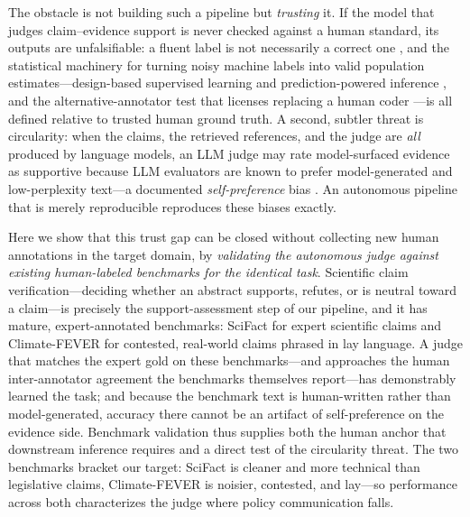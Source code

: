 The obstacle is not building such a pipeline but \emph{trusting} it. If the model that judges
claim--evidence support is never checked against a human standard, its outputs are unfalsifiable: a
fluent label is not necessarily a correct one \citep{bender2021stochastic}, and the statistical
machinery for turning noisy machine labels into valid population estimates---design-based supervised
learning and prediction-powered inference \citep{egami2023dsl,angelopoulos2023ppi}, and the
alternative-annotator test that licenses replacing a human coder \citep{calderon2025alttest}---is all
defined relative to trusted human ground truth. A second, subtler threat is circularity: when the
claims, the retrieved references, and the judge are \emph{all} produced by language models, an LLM
judge may rate model-surfaced evidence as supportive because LLM evaluators are known to prefer
model-generated and low-perplexity text---a documented \emph{self-preference} bias
\citep{panickssery2024llm,zheng2023judging}. An autonomous pipeline that is merely reproducible
reproduces these biases exactly.

Here we show that this trust gap can be closed without collecting new human annotations in the target
domain, by \emph{validating the autonomous judge against existing human-labeled benchmarks for the
identical task}. Scientific claim verification---deciding whether an abstract supports, refutes, or is
neutral toward a claim---is precisely the support-assessment step of our pipeline, and it has mature,
expert-annotated benchmarks: SciFact \citep{wadden2020fact} for expert scientific claims and
Climate-FEVER \citep{diggelmann2020climate} for contested, real-world claims phrased in lay language.
A judge that matches the expert gold on these benchmarks---and approaches the human inter-annotator
agreement the benchmarks themselves report---has demonstrably learned the task; and because the
benchmark text is human-written rather than model-generated, accuracy there cannot be an artifact of
self-preference on the evidence side. Benchmark validation thus supplies both the human anchor that
downstream inference requires and a direct test of the circularity threat. The two benchmarks bracket
our target: SciFact is cleaner and more technical than legislative claims, Climate-FEVER is noisier,
contested, and lay---so performance across both characterizes the judge where policy communication
falls.

